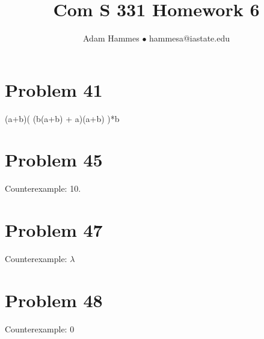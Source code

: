 \documentclass[11pt]{article}
\begin{document}
\title{Com S 331 Homework 6}
\author{Adam Hammes $\bullet$ hammesa@iastate.edu}
\maketitle

\section*{Problem 41}

(a+b)( (b(a+b) + a)(a+b) )*b

\section*{Problem 45}

Counterexample: 10.

\section*{Problem 47}

Counterexample: $\lambda$

\section*{Problem 48}

Counterexample: 0
\end{document}
